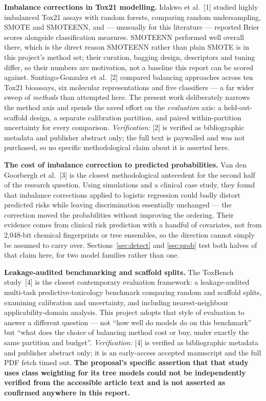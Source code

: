 \documentclass[10pt,letterpaper]{article}
\begin{document}
\textbf{Imbalance corrections in Tox21 modelling.} Idakwo et al.~[1] studied highly imbalanced Tox21
assays with random forests, comparing random undersampling, SMOTE and SMOTEENN, and --- unusually
for this literature --- reported Brier scores alongside classification measures. SMOTEENN performed
well overall there, which is the direct reason SMOTEENN rather than plain SMOTE is in this project's
method set; their curation, bagging design, descriptors and tuning differ, so their numbers are
motivation, not a baseline this report can be scored against. Santiago-Gonzalez et al.~[2] compared
balancing approaches across ten Tox21 bioassays, six molecular representations and five classifiers
--- a far wider sweep of \emph{methods} than attempted here. The present work deliberately narrows
the method axis and spends the saved effort on the \emph{evaluation} axis: a held-out-scaffold
design, a separate calibration partition, and paired within-partition uncertainty for every
comparison. \emph{Verification:} [2] is verified as bibliographic metadata and publisher abstract
only; the full text is paywalled and was not purchased, so no specific methodological claim about it
is asserted here.

\textbf{The cost of imbalance correction to predicted probabilities.} Van den Goorbergh et al.~[3]
is the closest methodological antecedent for the second half of the research question. Using
simulations and a clinical case study, they found that imbalance corrections applied to logistic
regression could badly distort predicted risks while leaving discrimination essentially unchanged
--- the correction moved the probabilities without improving the ordering. Their evidence comes from
clinical risk prediction with a handful of covariates, not from 2{,}048-bit chemical fingerprints or
tree ensembles, so the direction cannot simply be assumed to carry over.
Sections~\ref{sec:detect} and \ref{sec:prob} test both halves of that claim here, for two model
families rather than one.

\textbf{Leakage-audited benchmarking and scaffold splits.} The ToxBench study~[4] is the closest
contemporary evaluation framework: a leakage-audited multi-task predictive-toxicology benchmark
comparing random and scaffold splits, examining calibration and uncertainty, and including
nearest-neighbour applicability-domain analysis. This project adopts that style of evaluation to
answer a different question --- not ``how well do models do on this benchmark'' but ``what does the
choice of balancing method cost or buy, under exactly the same partition and budget''.
\emph{Verification:} [4] is verified as bibliographic metadata and publisher abstract only; it is an
early-access accepted manuscript and the full PDF fetch timed out. \textbf{The proposal's specific
assertion that that study uses class weighting for its tree models could not be independently
verified from the accessible article text and is not asserted as confirmed anywhere in this report.}
\end{document}
